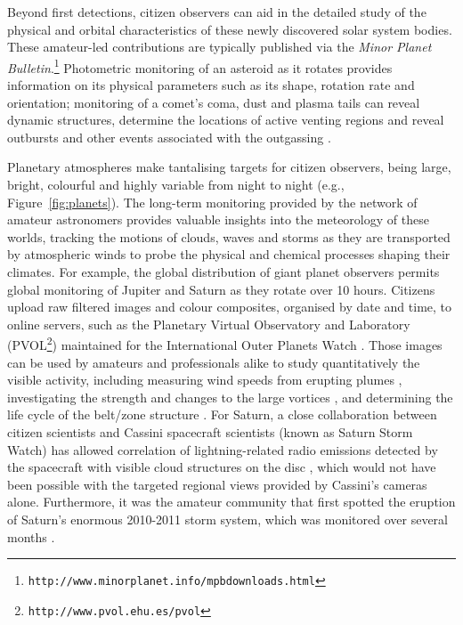 \documentclass{ar2e}
\def\Fref#1{Figure~\ref{#1}\xspace}
\def\CaseStudy#1{\noindent{\it\bf #1 \,\,\,\,}}
\def\url#1{\texttt{#1}}
\begin{document}
Beyond first detections, citizen observers can aid in the detailed study of the
physical and orbital characteristics of these newly discovered solar system
bodies. These amateur-led contributions are typically published via the
\textit{Minor Planet
Bulletin}.\footnote{\url{http://www.minorplanet.info/mpbdownloads.html}} 
Photometric monitoring of an asteroid as it rotates provides information on its
physical parameters such as its shape, rotation rate and orientation; 
monitoring of a comet's coma, dust and plasma tails can reveal dynamic
structures, determine the locations of active venting regions and reveal
outbursts and other events associated with the outgassing \citep[see][for a
comprehensive review]{14mousis_proam}.  


\CaseStudy{Planetary monitoring over long timescales}
Planetary atmospheres make tantalising targets for citizen observers, being
large, bright, colourful and highly variable from night to night (e.g., 
\Fref{fig:planets}).  The long-term monitoring provided by the network of amateur
astronomers provides valuable insights into the meteorology of these
worlds, tracking the motions of clouds, waves and storms as they are transported
by atmospheric winds to probe the physical and chemical processes shaping their
climates.  For example, the global distribution of giant planet observers
permits global monitoring of Jupiter and Saturn as they rotate over 10 hours.
Citizens upload raw filtered images and colour composites, organised by date and
time, to online servers, such as the Planetary Virtual Observatory and
Laboratory (PVOL\footnote{\url{http://www.pvol.ehu.es/pvol}}) maintained for the
International Outer Planets Watch \citep[IOPW][]{10hueso}.  Those images can be
used by amateurs and professionals alike to study quantitatively the visible
activity, including  measuring wind speeds from erupting plumes
\citep{08sanchez}, investigating the strength and changes to the large vortices
\citep[e.g., the 2006 reddening of Jupiter's Oval BA,][]{06simon-miller}, and
determining the life cycle of the belt/zone structure \citep{96sanchez,
11fletcher_fade}.  For Saturn, a close collaboration between citizen scientists
and Cassini spacecraft scientists (known as Saturn Storm Watch) has allowed
correlation of lightning-related radio emissions detected by the spacecraft with
visible cloud structures on the disc \citep[e.g.,][]{11fischer}, which would not
have been possible with the targeted regional views provided by Cassini's
cameras alone. Furthermore, it was the amateur community that first spotted the
eruption of Saturn's enormous 2010-2011 storm system, which was monitored over
several months \citep{12sanchez}.
\end{document}

